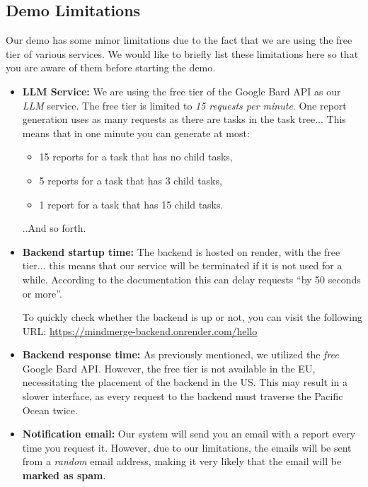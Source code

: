 \documentclass{article}
\begin{document}
\subsection{Demo Limitations}

Our demo has some minor limitations due to the fact that we are using the free tier of various services. We would like to briefly list these limitations here so that you are aware of them before starting the demo.

\begin{itemize}
  \item \textbf{LLM Service:} We are using the free tier of the Google Bard API as our \textit{LLM} service. The free tier is limited to \textit{15 requests per minute}.
        One report generation uses as many requests as there are tasks in the task tree... This means that in one minute you can generate at most:
        \begin{itemize}
          \item 15 reports for a task that has no child tasks,
          \item 5 reports for a task that has 3 child tasks,
          \item 1 report for a task that has 15 child tasks.
        \end{itemize}
        ..And so forth.
  \item \textbf{Backend startup time:} The backend is hosted on render, with the free tier... this means that our service will be 
        terminated if it is not used for a while. According to the documentation this can delay requests ``by 50 seconds or more''.

        To quickly check whether the backend is up or not, you can visit the following URL: \url{https://mindmerge-backend.onrender.com/hello}
  \item \textbf{Backend response time:} As previously mentioned, we utilized the \textit{free} Google Bard API. However, the free tier is not available in the EU, necessitating the placement of the backend in the US. This may result in a slower interface, as every request to the backend must traverse the Pacific Ocean twice.

  \item \textbf{Notification email:} Our system will send you an email with a report every time you request it. However, due to our limitations, the emails will be sent from a \textit{random} email address, making it very likely that the email will be \textbf{marked as spam}.
\end{itemize}
\end{document}
